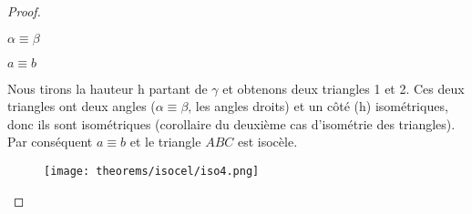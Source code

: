 \documentclass[a4paper,12pt]{article}
\begin{document}
\begin{proof}
\begin{enumerate}
    \begin{hyp}
     $\alpha \equiv \beta$
    \end{hyp}
    \begin{concl}
     $a\equiv b$
    \end{concl}
    Nous tirons la hauteur h partant de $\gamma$ et obtenons deux triangles 1 et 2. Ces deux triangles ont deux angles ($\alpha \equiv \beta$, les angles droits) et un côté (h) isométriques, donc ils sont isométriques (corollaire du deuxième cas d'isométrie des triangles). Par conséquent $a\equiv b$ et le triangle $ABC$ est isocèle.
    
    \begin{figure}[H]
        \centering
        \texttt{[image: theorems/isocel/iso4.png]}
    \end{figure}
    
\end{enumerate}
\end{proof}
\end{document}

